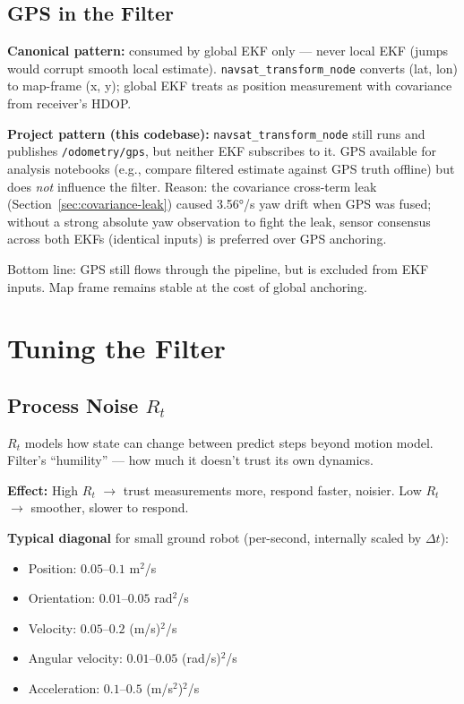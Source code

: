 \documentclass[11pt,a4paper]{article}
\begin{document}
\subsection{GPS in the Filter}

\textbf{Canonical pattern:} consumed by global EKF only --- never local EKF (jumps would corrupt smooth local estimate). \texttt{navsat\_transform\_node} converts (lat, lon) to map-frame (x, y); global EKF treats as position measurement with covariance from receiver's HDOP.

\textbf{Project pattern (this codebase):} \texttt{navsat\_transform\_node} still runs and publishes \texttt{/odometry/gps}, but neither EKF subscribes to it. GPS available for analysis notebooks (e.g., compare filtered estimate against GPS truth offline) but does \emph{not} influence the filter. Reason: the covariance cross-term leak (Section~\ref{sec:covariance-leak}) caused 3.56°/s yaw drift when GPS was fused; without a strong absolute yaw observation to fight the leak, sensor consensus across both EKFs (identical inputs) is preferred over GPS anchoring.

Bottom line: GPS still flows through the pipeline, but is excluded from EKF inputs. Map frame remains stable at the cost of global anchoring.

\section{Tuning the Filter}

\subsection{Process Noise $R_t$}

$R_t$ models how state can change between predict steps beyond motion model. Filter's ``humility'' --- how much it doesn't trust its own dynamics.

\textbf{Effect:} High $R_t$ $\to$ trust measurements more, respond faster, noisier. Low $R_t$ $\to$ smoother, slower to respond.

\textbf{Typical diagonal} for small ground robot (per-second, internally scaled by $\Delta t$):
\begin{itemize}
\item Position: $0.05$--$0.1$ m$^2$/s
\item Orientation: $0.01$--$0.05$ rad$^2$/s
\item Velocity: $0.05$--$0.2$ (m/s)$^2$/s
\item Angular velocity: $0.01$--$0.05$ (rad/s)$^2$/s
\item Acceleration: $0.1$--$0.5$ (m/s$^2$)$^2$/s
\end{itemize}
\end{document}
